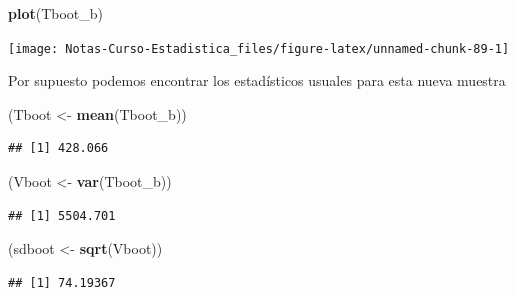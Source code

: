 \documentclass[
  12pt,
]{book}
\newenvironment{Shaded}{\begin{snugshade}}{\end{snugshade}}
\newcommand{\KeywordTok}[1]{\textcolor[rgb]{0.13,0.29,0.53}{\textbf{#1}}}
\newcommand{\NormalTok}[1]{#1}
\newcommand{\StringTok}[1]{\textcolor[rgb]{0.31,0.60,0.02}{#1}}
\theoremstyle{definition}
\theoremstyle{definition}
\theoremstyle{definition}
\theoremstyle{remark}
\begin{document}
\begin{Shaded}
\begin{Highlighting}[]
\KeywordTok{plot}\NormalTok{(Tboot_b)}
\end{Highlighting}
\end{Shaded}

\begin{center}\texttt{[image: Notas-Curso-Estadistica\_files/figure-latex/unnamed-chunk-89-1]} \end{center}

Por supuesto podemos encontrar los estadísticos usuales para esta nueva muestra

\begin{Shaded}
\begin{Highlighting}[]
\NormalTok{(Tboot <-}\StringTok{ }\KeywordTok{mean}\NormalTok{(Tboot_b))}
\end{Highlighting}
\end{Shaded}

\begin{verbatim}
## [1] 428.066
\end{verbatim}

\begin{Shaded}
\begin{Highlighting}[]
\NormalTok{(Vboot <-}\StringTok{ }\KeywordTok{var}\NormalTok{(Tboot_b))}
\end{Highlighting}
\end{Shaded}

\begin{verbatim}
## [1] 5504.701
\end{verbatim}

\begin{Shaded}
\begin{Highlighting}[]
\NormalTok{(sdboot <-}\StringTok{ }\KeywordTok{sqrt}\NormalTok{(Vboot))}
\end{Highlighting}
\end{Shaded}

\begin{verbatim}
## [1] 74.19367
\end{verbatim}
\end{document}
